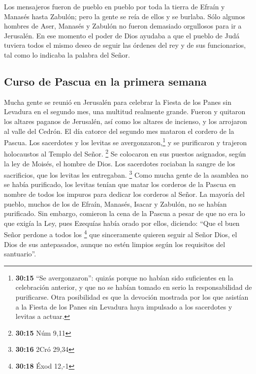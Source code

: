  Los mensajeros fueron de pueblo en pueblo por toda la
tierra de Efraín y Manasés hasta Zabulón; pero la gente se reía de ellos
y se burlaba.  Sólo algunos hombres de Aser, Manasés y
Zabulón no fueron demasiado orgullosos para ir a Jerusalén.
 En ese momento el poder de Dios ayudaba a que el pueblo
de Judá tuviera todos el mismo deseo de seguir las órdenes del rey y de
sus funcionarios, tal como lo indicaba la palabra del Señor.

\hypertarget{curso-de-pascua-en-la-primera-semana}{%
\subsection{Curso de Pascua en la primera
semana}\label{curso-de-pascua-en-la-primera-semana}}

 Mucha gente se reunió en Jerusalén para celebrar la
Fiesta de los Panes sin Levadura en el segundo mes, una multitud
realmente grande.  Fueron y quitaron los altares paganos
de Jerusalén, así como los altares de incienso, y los arrojaron al valle
del Cedrón.  El día catorce del segundo mes mataron el
cordero de la Pascua. Los sacerdotes y los levitas se
avergonzaron,\footnote{\textbf{30:15} ``Se avergonzaron'': quizás porque
  no habían sido suficientes en la celebración anterior, y que no se
  habían tomado en serio la responsabilidad de purificarse. Otra
  posibilidad es que la devoción mostrada por los que asistían a la
  Fiesta de los Panes sin Levadura haya impulsado a los sacerdotes y
  levitas a actuar.} y se purificaron y trajeron holocaustos al Templo
del Señor. \footnote{\textbf{30:15} Núm 9,11}  Se
colocaron en sus puestos asignados, según la ley de Moisés, el hombre de
Dios. Los sacerdotes rociaban la sangre de los sacrificios, que los
levitas les entregaban. \footnote{\textbf{30:16} 2Cró 29,34}
 Como mucha gente de la asamblea no se había purificado,
los levitas tenían que matar los corderos de la Pascua en nombre de
todos los impuros para dedicar los corderos al Señor.  La
mayoría del pueblo, muchos de los de Efraín, Manasés, Isacar y Zabulón,
no se habían purificado. Sin embargo, comieron la cena de la Pascua a
pesar de que no era lo que exigía la Ley, pues Ezequías había orado por
ellos, diciendo: ``Que el buen Señor perdone a todos los \footnote{\textbf{30:18}
  Éxod 12,-1}  que sinceramente quieren seguir al Señor
Dios, el Dios de sus antepasados, aunque no estén limpios según los
requisitos del santuario''.

